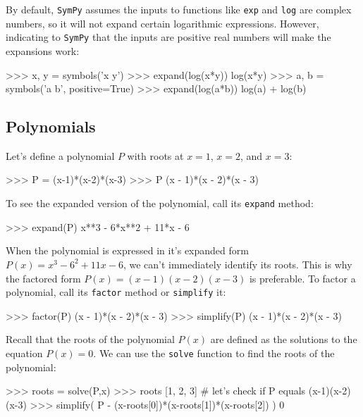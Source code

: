 \noindent
By default, \texttt{SymPy} assumes the inputs to functions like \texttt{exp} and \texttt{log} are complex numbers,
so it will not expand certain logarithmic expressions.
However, indicating to \texttt{SymPy} that the inputs are positive real numbers will make the expansions work:

\small
\begin{verbatimtab}
>>> x, y = symbols('x y')
>>> expand(log(x*y))
log(x*y)
>>> a, b = symbols('a b', positive=True)
>>> expand(log(a*b))
log(a) + log(b)
\end{verbatimtab}
\normalsize
\subsection{Polynomials}
\label{basics:polynomials}

Let's define a polynomial $P$ with roots at $x=1$, $x=2$, and $x=3$:											

\small
\begin{verbatimtab}
>>> P = (x-1)*(x-2)*(x-3)
>>> P
(x - 1)*(x - 2)*(x - 3)
\end{verbatimtab}
\normalsize

\noindent
To see the expanded version of the polynomial,
call its \texttt{expand} method:																			

\small
\begin{verbatimtab}
>>> expand(P)
x**3 - 6*x**2 + 11*x - 6
\end{verbatimtab}
\normalsize

\noindent
When the polynomial is expressed in it's expanded form $P(x)=x^3-6^2 + 11x - 6$,
we can't immediately identify its roots.
This is why the factored form $P(x)=(x-1)(x-2)(x-3)$ is preferable.
To factor a polynomial,
call its \texttt{factor} method or \texttt{simplify} it:															

\small
\begin{verbatimtab}
>>> factor(P)
(x - 1)*(x - 2)*(x - 3)
>>> simplify(P)
(x - 1)*(x - 2)*(x - 3)
\end{verbatimtab}
\normalsize

\noindent
Recall that the roots of the polynomial $P(x)$ are defined as the solutions to the equation $P(x)=0$.
We can use the \texttt{solve} function to find the roots of the polynomial:

\small
\begin{verbatimtab}
>>> roots = solve(P,x)
>>> roots
[1, 2, 3]
# let's check if P equals (x-1)(x-2)(x-3)
>>> simplify( P  -  (x-roots[0])*(x-roots[1])*(x-roots[2]) )   
0  
\end{verbatimtab}
\normalsize



